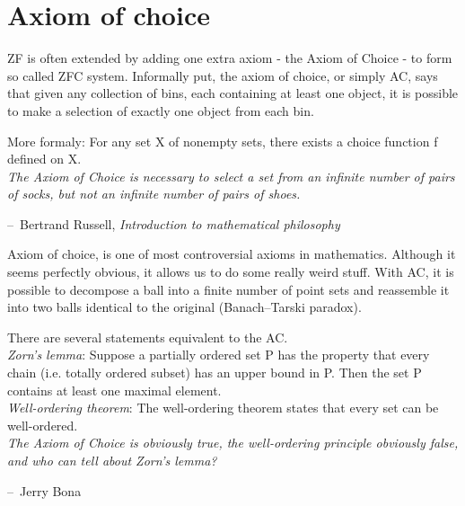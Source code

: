 \documentclass[11pt,a5paper]{article}
\makeatletter
\newenvironment{chapquote}[2][2em]
  {\setlength{\@tempdima}{#1}%
   \def\chapquote@author{#2}%
   \parshape 1 \@tempdima \dimexpr\textwidth-2\@tempdima\relax%
   \itshape}
  {\par\normalfont\hfill--\ \chapquote@author\hspace*{\@tempdima}\par\bigskip}
\makeatother
\begin{document}
\section{Axiom of choice}

\noindent ZF is often extended by adding one extra axiom - the Axiom of Choice - to form so called ZFC system. Informally put, the axiom of choice, or simply AC, says that given any collection of bins, each containing at least one object, it is possible to make a selection of exactly one object from each bin.

\noindent More formaly: For any set X of nonempty sets, there exists a choice function f defined on X.
\\

\begin{chapquote}{Bertrand Russell, \textit{Introduction to mathematical philosophy}}
\noindent The Axiom of Choice is necessary to select a set from an infinite number of pairs of socks, but not an infinite number of pairs of shoes.
\end{chapquote}	

\noindent Axiom of choice, is one of most controversial axioms in mathematics. Although it seems perfectly obvious, it allows us to do some really weird stuff. With AC, it is possible to decompose a ball into a finite number of point sets and reassemble it into two balls identical to the original (Banach–Tarski paradox). 

\noindent There are several statements equivalent to the AC. \\

\noindent \emph{Zorn's lemma}: 
Suppose a partially ordered set P has the property that every chain (i.e. totally ordered subset) has an upper bound in P. Then the set P contains at least one maximal element.\\

\noindent \emph{Well-ordering theorem}: 
The well-ordering theorem states that every set can be well-ordered.\\

\begin{chapquote}{Jerry Bona}
\noindent The Axiom of Choice is obviously true, the well-ordering principle obviously false, and who can tell about Zorn's lemma?
\end{chapquote}	
\end{document}

